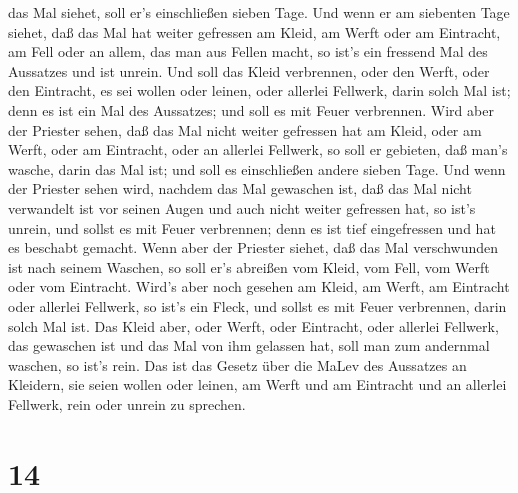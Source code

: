 das Mal siehet, soll er's einschließen sieben Tage.  Und
wenn er am siebenten Tage siehet, daß das Mal hat weiter gefressen am
Kleid, am Werft oder am Eintracht, am Fell oder an allem, das man aus
Fellen macht, so ist's ein fressend Mal des Aussatzes und ist unrein.
 Und soll das Kleid verbrennen, oder den Werft, oder den
Eintracht, es sei wollen oder leinen, oder allerlei Fellwerk, darin
solch Mal ist; denn es ist ein Mal des Aussatzes; und soll es mit Feuer
verbrennen.  Wird aber der Priester sehen, daß das Mal
nicht weiter gefressen hat am Kleid, oder am Werft, oder am Eintracht,
oder an allerlei Fellwerk,  so soll er gebieten, daß man's
wasche, darin das Mal ist; und soll es einschließen andere sieben Tage.
 Und wenn der Priester sehen wird, nachdem das Mal
gewaschen ist, daß das Mal nicht verwandelt ist vor seinen Augen und
auch nicht weiter gefressen hat, so ist's unrein, und sollst es mit
Feuer verbrennen; denn es ist tief eingefressen und hat es beschabt
gemacht.  Wenn aber der Priester siehet, daß das Mal
verschwunden ist nach seinem Waschen, so soll er's abreißen vom Kleid,
vom Fell, vom Werft oder vom Eintracht.  Wird's aber noch
gesehen am Kleid, am Werft, am Eintracht oder allerlei Fellwerk, so
ist's ein Fleck, und sollst es mit Feuer verbrennen, darin solch Mal
ist.  Das Kleid aber, oder Werft, oder Eintracht, oder
allerlei Fellwerk, das gewaschen ist und das Mal von ihm gelassen hat,
soll man zum andernmal waschen, so ist's rein.  Das ist das
Gesetz über die MaLev des Aussatzes an Kleidern, sie seien wollen oder
leinen, am Werft und am Eintracht und an allerlei Fellwerk, rein oder
unrein zu sprechen.

\hypertarget{section-13}{%
\section{14}\label{section-13}}

